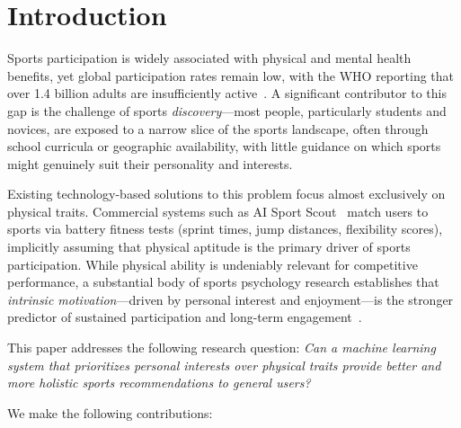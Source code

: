 \documentclass[conference]{IEEEtran}
\begin{document}
\section{Introduction}
\label{sec:intro}

Sports participation is widely associated with physical and mental health
benefits, yet global participation rates remain low, with the WHO reporting
that over 1.4 billion adults are insufficiently active~\cite{who2022activity}.
A significant contributor to this gap is the challenge of sports
\textit{discovery}---most people, particularly students and novices, are
exposed to a narrow slice of the sports landscape, often through school
curricula or geographic availability, with little guidance on which sports
might genuinely suit their personality and interests.

Existing technology-based solutions to this problem focus almost exclusively
on physical traits. Commercial systems such as AI Sport Scout~\cite{aisportscout2024}
match users to sports via battery fitness tests (sprint times, jump distances,
flexibility scores), implicitly assuming that physical aptitude is the
primary driver of sports participation. While physical ability is undeniably
relevant for competitive performance, a substantial body of sports
psychology research establishes that \textit{intrinsic motivation}---driven
by personal interest and enjoyment---is the stronger predictor of sustained
participation and long-term engagement~\cite{pelletier1995motivation,
vallerand2003passions, fraserThomas2006youth}.

This paper addresses the following research question:
\textit{Can a machine learning system that prioritizes personal interests
over physical traits provide better and more holistic sports recommendations
to general users?}

We make the following contributions:
\end{document}
